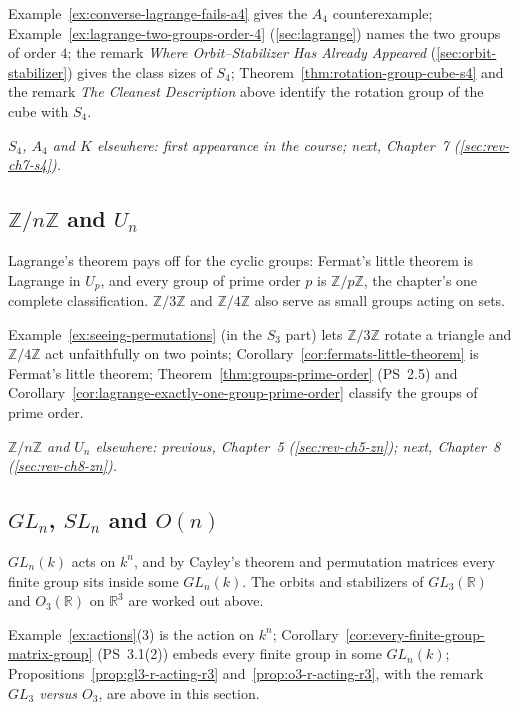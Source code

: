 \documentclass[11pt]{report}
\begin{document}
Example~\ref{ex:converse-lagrange-fails-a4} gives the $A_4$ counterexample; Example~\ref{ex:lagrange-two-groups-order-4} (\ref{sec:lagrange}) names the two groups of order $4$; the remark \emph{Where Orbit--Stabilizer Has Already Appeared} (\ref{sec:orbit-stabilizer}) gives the class sizes of $S_4$; Theorem~\ref{thm:rotation-group-cube-s4} and the remark \emph{The Cleanest Description} above identify the rotation group of the cube with $S_4$.

\textit{$S_4$, $A_4$ and $K$ elsewhere: first appearance in the course; next, Chapter~7 (\ref{sec:rev-ch7-s4}).}

\subsection{\texorpdfstring{$\mathbb{Z}/n\mathbb{Z}$ and $U_n$}{ℤ/nℤ and Uₙ}}\label{sec:rev-ch6-zn}

Lagrange's theorem pays off for the cyclic groups: Fermat's little theorem is Lagrange in $U_p$, and every group of prime order $p$ is $\mathbb{Z}/p\mathbb{Z}$, the chapter's one complete classification. $\mathbb{Z}/3\mathbb{Z}$ and $\mathbb{Z}/4\mathbb{Z}$ also serve as small groups acting on sets.

Example~\ref{ex:seeing-permutations} (in the $S_3$ part) lets $\mathbb{Z}/3\mathbb{Z}$ rotate a triangle and $\mathbb{Z}/4\mathbb{Z}$ act unfaithfully on two points; Corollary~\ref{cor:fermats-little-theorem} is Fermat's little theorem; Theorem~\ref{thm:groups-prime-order} (PS~2.5) and Corollary~\ref{cor:lagrange-exactly-one-group-prime-order} classify the groups of prime order.

\textit{$\mathbb{Z}/n\mathbb{Z}$ and $U_n$ elsewhere: previous, Chapter~5 (\ref{sec:rev-ch5-zn}); next, Chapter~8 (\ref{sec:rev-ch8-zn}).}

\subsection{\texorpdfstring{$GL_n$, $SL_n$ and $O(n)$}{GLₙ, SLₙ and O(n)}}\label{sec:rev-ch6-gl}

$GL_n(k)$ acts on $k^n$, and by Cayley's theorem and permutation matrices every finite group sits inside some $GL_n(k)$. The orbits and stabilizers of $GL_3(\mathbb{R})$ and $O_3(\mathbb{R})$ on $\mathbb{R}^3$ are worked out above.

Example~\ref{ex:actions}(3) is the action on $k^n$; Corollary~\ref{cor:every-finite-group-matrix-group} (PS~3.1(2)) embeds every finite group in some $GL_n(k)$; Propositions~\ref{prop:gl3-r-acting-r3} and~\ref{prop:o3-r-acting-r3}, with the remark \emph{$GL_3$ versus $O_3$}, are above in this section.
\end{document}
